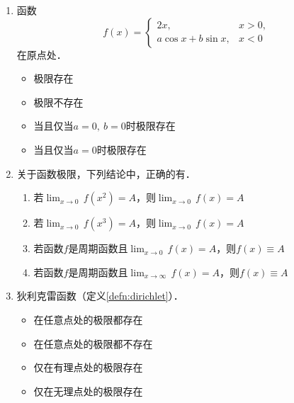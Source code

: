\documentclass[a4paper,punct=CCT]{ctexbook}
\renewcommand*{\enumparen}[1]{（\makebox[0.6em][c]{\normalfont#1}）}
\theoremstyle{definition}
\theoremstyle{remark}
\newif\ifshowsol
\begin{document}
\begin{enumerate}
\item 函数
  \begin{equation*}
    f(x) =
    \begin{cases}
      2x, & x > 0, \\
      a \cos x + b \sin x, & x < 0
    \end{cases}
  \end{equation*}
  在原点处\uline{\makebox[6em]{}}．
  \begin{itemize}
    \renewcommand{\labelitemi}{\faCircleThin}
  \item 极限存在
  \item 极限不存在
  \item 当且仅当\(a = 0,\ b = 0\)时极限存在
    \ifshowsol
  \item[\faCircle]
    \else
  \item
    \fi
    当且仅当\(a = 0\)时极限存在
  \end{itemize}

\item 关于函数极限，下列结论中，正确的有\uline{\makebox[6em]{%
      \ifshowsol
      \enumparen{2}%
      \enumparen{4}
      \fi}}．
  \begin{enumerate}
    \renewcommand{\labelenumii}{\enumparen{\arabic{enumii}}}
  \item 若\(\lim_{x\to0} \,f(x^2) = A\)，则\(\lim_{x\to0} \,f(x) = A\)
  \item 若\(\lim_{x\to0} \,f(x^3) = A\)，则\(\lim_{x\to0} \,f(x) = A\)
  \item 若函数\(f\)是周期函数且\(\lim_{x\to0} \,f(x) = A\)，则\(f(x) \equiv A\)
  \item 若函数\(f\)是周期函数且\(\lim_{x\to\infty} \,f(x) = A\)，则\(f(x) \equiv A\)
  \end{enumerate}

\item 狄利克雷函数（定义\ref{defn:dirichlet}）\uline{\makebox[6em]{}}．
  \begin{itemize}
    \renewcommand{\labelitemi}{\faCircleThin}
  \item 在任意点处的极限都存在
    \ifshowsol
  \item[\faCircle]
    \else
  \item
    \fi
    在任意点处的极限都不存在
  \item 仅在有理点处的极限存在
  \item 仅在无理点处的极限存在
  \end{itemize}


\end{enumerate}
\end{document}
